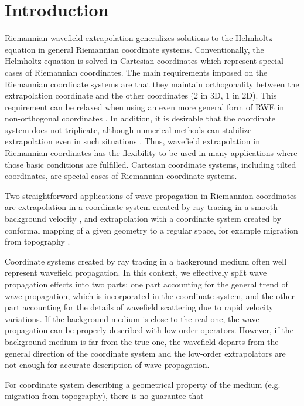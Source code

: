 \section{Introduction}
Riemannian wavefield extrapolation \cite[]{SavaFomel.geo.rwe}
generalizes solutions to the Helmholtz equation in general Riemannian
coordinate systems. Conventionally, the Helmholtz equation is solved
in Cartesian coordinates which represent special cases of Riemannian
coordinates. The main requirements imposed on the Riemannian
coordinate systems are that they maintain orthogonality between the
extrapolation coordinate and the other coordinates (2 in 3D, 1 in
2D). This requirement can be relaxed when using an even more general
form of RWE in non-orthogonal coordinates
\cite[]{Shragge.geo.nonlinear}. In addition, it is desirable that the
coordinate system does not triplicate, although numerical methods can
stabilize extrapolation even in such situations
\cite[]{SavaFomel.geo.rwe}. Thus, wavefield extrapolation in
Riemannian coordinates has the flexibility to be used in many
applications where those basic conditions are fulfilled. Cartesian
coordinate systems, including tilted coordinates, are special cases of
Riemannian coordinate systems.
%
\par Two straightforward applications of wave propagation in
Riemannian coordinates are extrapolation in a coordinate system
created by ray tracing in a smooth background velocity
\cite[]{SavaFomel.geo.rwe}, and extrapolation with a coordinate system
created by conformal mapping of a given geometry to a regular space,
for example migration from topography \cite[]{ShraggeSava.segab.2005}.
%
\par Coordinate systems created by ray tracing in a background medium
often well represent wavefield propagation. In this context, we
effectively split wave propagation effects into two parts: one part
accounting for the general trend of wave propagation, which is
incorporated in the coordinate system, and the other part accounting
for the details of wavefield scattering due to rapid velocity
variations. If the background medium is close to the real one, the
wave-propagation can be properly described with low-order
operators. However, if the background medium is far from the true one,
the wavefield departs from the general direction of the coordinate
system and the low-order extrapolators are not enough for accurate
description of wave propagation.
%
\par For coordinate system describing a geometrical property of the
medium (e.g. migration from topography), there is no guarantee that
